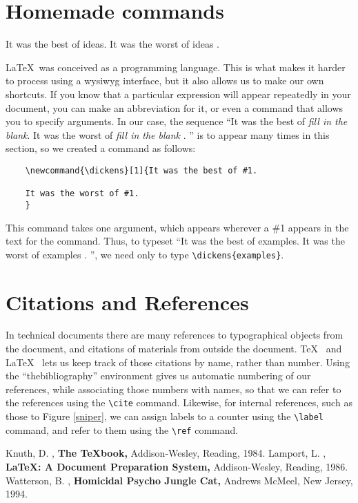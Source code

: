 \documentclass[12pt]{article}
\begin{document}
\section{Homemade commands}
\newcommand{\dickens}[1]{It was the best of #1.
It was the worst of #1
.
}
\dickens{ideas}
\LaTeX\ was conceived as a programming language.
This is what makes it
harder to process using a wysiwyg interface, but it also allows
us to make our own shortcuts.
If you know that a particular expression will appear repeatedly
in your document, you can make an abbreviation for it, or even
a command that allows you to specify arguments.
In our case,
the sequence ``\dickens{{\it fill in the blank}}''
is to appear many times in this section, so we created a command
as follows:
\begin{verbatim}
    \newcommand{\dickens}[1]{It was the best of #1.

    It was the worst of #1.
    }
\end{verbatim}
This command takes one argument, which appears wherever a \#1 appears
in the text for the command.
Thus, to typeset ``\dickens{examples}'',
we need only to type \verb(\dickens{examples}(.

\section{Citations and References}
In technical documents there are many references to 
typographical objects from the document, and citations
of materials from outside the document.
\TeX\ \cite{knuth}
and \LaTeX\ \cite{lamport} lets us keep track of those citations
by name, rather than number.
Using the ``thebibliography'' 
environment gives us automatic numbering of our references,
while associating those numbers with names, so that we can
refer to the references using the \verb(\cite( command.
Likewise, for internal references, such as those to Figure \ref{sniper},
we can assign labels to a counter using the \verb(\label(
command, and refer to them using the \verb(\ref( command.

\begin{thebibliography}{X}
     Knuth, D.
    , {\bf The \TeX book,} Addison-Wesley, Reading, 1984.
     Lamport, L.
    , {\bf \LaTeX: A Document Preparation System,}
    Addison-Wesley, Reading, 1986.
     Watterson, B.
    , {\bf Homicidal Psycho Jungle Cat,}
    Andrews McMeel, New Jersey, 1994.
\end{thebibliography}
\end{document}
